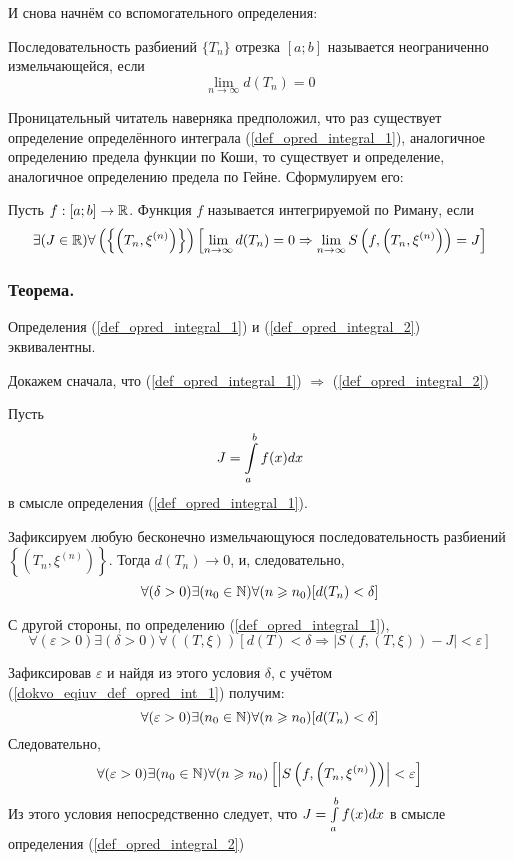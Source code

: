 И снова начнём со вспомогательного определения:

\opred
Последовательность разбиений $\{T_n\}$ отрезка $[a;b]$ называется неограниченно измельчающейся, если 
$$\lim_{n\to\infty}d(T_n) = 0$$

Проницательный читатель наверняка предположил, что раз существует определение определённого интеграла (\ref{def_opred_integral_1}), аналогичное определению предела функции по Коши, то существует и определение, аналогичное определению предела по Гейне. Сформулируем его:

\begin{opr}\label{eqiv_opr_opr_intl}
Пусть $f:[a;b]\to \mathbb{R}$. Функция $f$ называется интегрируемой по Риману, если
\begin{equation}\label{def_opred_integral_2}
\exists(J\in\mathbb{R})\forall\left(\left\{\left(T_n,\xi^{(n)}\right)\right\}\right)
\left[\lim_{n\to\infty}d(T_n) = 0 \Rightarrow \lim_{n\to\infty}S\left(f,\left(T_n,\xi^{(n)}\right)\right)=J\right]
\end{equation}
\end{opr}

\subsubsection{Теорема.}
Определения (\ref{def_opred_integral_1}) и (\ref{def_opred_integral_2}) эквивалентны.

Докажем сначала, что (\ref{def_opred_integral_1}) $\Rightarrow$ (\ref{def_opred_integral_2})

\dokvo
Пусть $$J=\int\limits_a^b f(x) dx $$ в смысле определения (\ref{def_opred_integral_1}).

Зафиксируем любую бесконечно измельчающуюся последовательность разбиений $\left\{\left( T_n, \xi^{(n)}\right)\right\}$. Тогда $d(T_n)\to 0$, и, следовательно,
\begin{equation}\label{dokvo_eqiuv_def_opred_int_1}
\forall(\delta>0)\exists(n_0\in\mathbb{N})\forall(n\geqslant n_0)[d(T_n)<\delta]
\end{equation}

С другой стороны, по определению (\ref{def_opred_integral_1}),
$$
\forall(\varepsilon>0)\exists(\delta>0)\forall((T,\xi))[d(T)<\delta \Rightarrow |S(f,(T,\xi))-J|<\varepsilon]
$$

Зафиксировав $\varepsilon$ и найдя из этого условия $\delta$, с учётом (\ref{dokvo_eqiuv_def_opred_int_1}) получим:
$$
\forall(\varepsilon>0)\exists(n_0\in\mathbb{N})\forall(n\geqslant n_0)[d(T_n)<\delta]
$$
Следовательно,
$$
\forall(\varepsilon>0)\exists(n_0\in\mathbb{N})\forall(n\geqslant n_0)\left[\left|S\left(f,\left(T_n,\xi^{(n)}\right)\right)\right|<\varepsilon\right]
$$
Из этого условия непосредственно следует, что $J=\int\limits_a^b f(x) dx$ в смысле определения (\ref{def_opred_integral_2})

